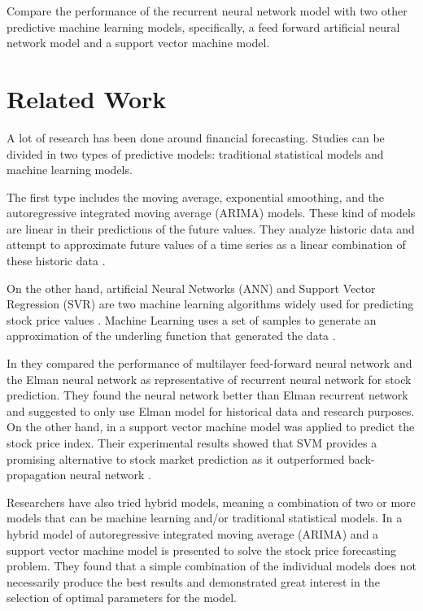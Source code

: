 Compare the performance of the recurrent neural network model with two other predictive machine learning models, specifically, a feed forward artificial neural network model and a support vector machine model.

\section{Related Work}

A lot of research has been done around financial forecasting. Studies can be divided in two types of predictive models: traditional statistical models and machine learning models.

The first type includes the moving average, exponential smoothing, and the  autoregressive integrated moving average (ARIMA) models. These kind of models are linear in their predictions of the future values. They analyze historic data and attempt to approximate future values of a time series as a linear combination of these historic data \cite{shah2014performance}. 

On the other hand, artificial Neural Networks (ANN) and Support Vector Regression (SVR) are two machine learning algorithms widely used for predicting stock price values \cite{patel2015predicting}. Machine Learning uses a set of samples to generate an approximation of the underling function that generated the data \cite{shah2014performance}.

In \cite{shah2014performance} they compared the performance of multilayer feed-forward neural network and the Elman neural network as representative of recurrent neural network for stock prediction. They found the neural network  better than Elman recurrent network and suggested to only use Elman model for historical data and research purposes. On the other hand, in \cite{kim2003financial} a support vector machine model was applied to predict the stock price index. Their experimental results showed that SVM provides a promising alternative to stock market prediction as it outperformed back-propagation neural network .

Researchers have also tried hybrid models, meaning a combination of two or more models that can be machine learning and/or traditional statistical models. In \cite{pai2005hybrid} a hybrid model of autoregressive integrated moving average (ARIMA) and a support vector machine model is presented to solve the stock price forecasting problem. They found that a simple combination of the individual models does not necessarily produce the best results and demonstrated great interest in the selection of optimal parameters for the model.

